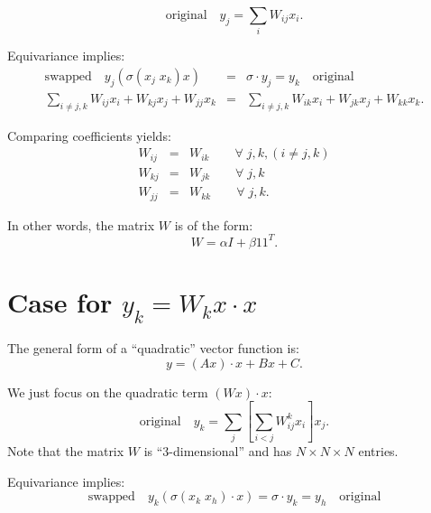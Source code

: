 \begin{equation}
\boxed{\mbox{original}} \quad y_j = \sum_i W_{ij} x_i .
\end{equation}

Equivariance implies:
\begin{eqnarray}
\boxed{\mbox{swapped}} \quad y_j ( \sigma(x_j \; x_k) x) &=& \sigma \cdot y_j = y_k \quad \boxed{\mbox{original}} \\
\sum_{i \neq j,k} W_{ij} x_i + W_{kj} x_j + W_{jj} x_k &=& \sum_{i \neq j,k} W_{ik} x_i + W_{jk} x_j + W_{kk} x_k . \nonumber
\end{eqnarray}


Comparing coefficients yields:
\begin{eqnarray}
W_{ij} &=& W_{ik} \quad \quad \forall \; j, k, (i \neq j, k) \nonumber \\
W_{kj} &=& W_{jk} \quad \quad \forall \; j, k \nonumber \\
W_{jj} &=& W_{kk} \quad \quad \forall \; j, k .
\end{eqnarray}

In other words, the matrix $W$ is of the form:
\begin{equation}
W = \alpha I + \beta 1 1^T .
\end{equation}

\section{Case for $y_k = W_k x \cdot x$}

The general form of a ``quadratic'' vector function is:
\begin{equation}
y = (A x) \cdot x + B x + C .
\end{equation}

We just focus on the quadratic term $(W x) \cdot x$:
\begin{equation}
\boxed{\mbox{original}} \quad y_k = \sum_j \left[ \sum_{i < j} W_{ij}^k x_i \right] x_j .
\end{equation}
Note that the matrix $W$ is ``3-dimensional'' and has $N \times N \times N$ entries.

Equivariance implies:
\begin{equation}
\boxed{\mbox{swapped}} \quad y_k ( \sigma(x_k \; x_h) \cdot x) = \sigma \cdot y_k = y_h \quad \boxed{\mbox{original}}
\end{equation}

